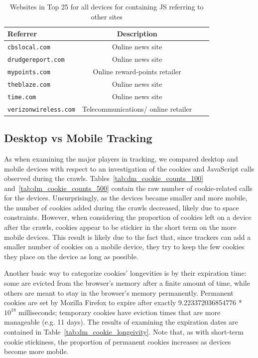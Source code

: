 \documentclass{acm_proc_article-sp}
\begin{document}
\begin{table}[htbp]
  \centering
  \caption{Websites in Top 25 for all devices for containing JS referring to other sites}
    \begin{tabular}{|c|c|c|c|}
    \hline
     \multicolumn{1}{|l|}{\textbf{Referrer}} & \textbf{Description}    \\ \hline
     \multicolumn{1}{|l|}{\texttt{cbslocal.com}} & Online news site   \\
    \multicolumn{1}{|l|}{\texttt{drudgereport.com}} & Online news site   \\
     \multicolumn{1}{|l|}{\texttt{mypoints.com}} & Online reward-points retailer   \\
      \multicolumn{1}{|l|}{\texttt{theblaze.com}} & Online news site   \\
       \multicolumn{1}{|l|}{\texttt{time.com}} & Online news site   \\
        \multicolumn{1}{|l|}{\texttt{verizonwireless.com}} & Telecommunications/ online retailer   \\ \hline
    \end{tabular}%
  \label{tab:major_js}%
\end{table}%

\subsection{Desktop vs Mobile Tracking}
\label{sec:desktop_vs_mobile}

As when examining the major players in tracking, we compared desktop and mobile devices with respect to an investigation of the cookies and JavaScript calls observed during the crawls. Tables~\ref{tab:dm_cookie_counts_100} and~\ref{tab:dm_cookie_counts_500} contain the raw number of cookie-related calls for the devices. Unsurprisingly, as the devices became smaller and more mobile, the number of cookies added during the crawls decreased, likely due to space constraints. However, when considering the proportion of cookies left on a device after the crawls, cookies appear to be stickier in the short term on the more mobile devices. This result is likely due to the fact that, since trackers can add a smaller number of cookies on a mobile device, they try to keep the few cookies they place on the device as long as possible.

Another basic way to categorize cookies' longevities is by their expiration time: some are evicted from the browser's memory after a finite amount of time, while others are meant to stay in the browser's memory permanently. Permanent cookies are set by Mozilla Firefox to expire after exactly 9.223372036854776 * $10^{18}$ milliseconds; temporary cookies have eviction times that are more manageable (e.g. 11 days). The results of examining the expiration dates are contained in Table~\ref{tab:dm_cookie_longeivity}. Note that, as with short-term cookie stickiness, the proportion of permanent cookies increases as devices become more mobile.
\end{document}

